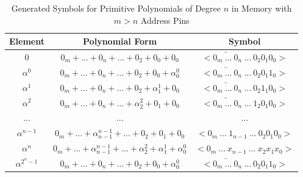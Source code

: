     \begin{table}[h!]
        \def\arraystretch{2.5}
        \caption{Generated Symbols for Primitive Polynomials of Degree $n$ in Memory with $m > n$ Address Pins}
        \centering
        \begin{tabular*}{400pt}{@{\extracolsep{\fill}} ccc}

        \textbf{Element} & \textbf{Polynomial Form} & \textbf{Symbol}
        \\
        \hline $0$ & $0_{m} + \ldots + 0_{n} + \ldots + 0_{2} +
        0_{0} + 0_{0}$ & $< \overleftarrow{0_{m} \ \ldots \
        0_{n}} \ \ldots \ 0_{2} 0_{1} 0_{0} >$ \\


        $\alpha^{0}$ & $0_{m} + \ldots + 0_{n} + \ldots + 0_{2} +
        0_{0} + \alpha^{0}_{0}$ & $< \overleftarrow{0_{m} \ \ldots \
        0_{n}} \ \ldots \ 0_{2} 0_{1} 1_{0} >$ \\

        $\alpha^{1}$ & $0_{m} + \ldots + 0_{n} + \ldots + 0_{2} +
        \alpha^{1}_{1} + 0_{0}$ & $< \overleftarrow{0_{m} \ \ldots \
        0_{n}} \ \ldots \ 0_{2} 1_{1} 0_{0} >$ \\

        $\alpha^{2}$ & $0_{m} + \ldots + 0_{n} + \ldots +
        \alpha^{2}_{2} + 0_{1} + 0_{0}$ & $< \overleftarrow{0_{m} \ \ldots \
        0_{n}} \ \ldots \ 1_{2} 0_{1} 0_{0} >$ \\

        $\ldots$ & $\ldots$ & $\ldots$ \\

        $\alpha^{n-1}$ & $0_{m} + \ldots + \alpha^{n-1}_{n-1} + \ldots
        + 0_{2} + 0_{1} + 0_{0}$ & $< 0_{m} \ \ldots \ 1_{n-1} \ \ldots \
          0_{2} 0_{1} 0_{0} >$ \\

        $\alpha^{n}$ & $0_{m} + \ldots + \alpha^{n-1}_{n-1} + \ldots
        +\alpha^{2}_{2} + \alpha^{1}_{1} + \alpha^{0}_{0}$ & $< 0_{m} \
        \ldots \ x_{n-1} \ \ldots \ x_{2} x_{1} x_{0} >$ \\

        $\alpha^{2^n-1}$ & $0_{m} + \ldots + 0_{n} + \ldots + 0_{2} +
        0_{0} + \alpha^{0}_{0}$ & $< \overleftarrow{0_{m} \ \ldots \
        0_{n}} \ \ldots \ 0_{2} 0_{1} 1_{0} >$ \\

        \end{tabular*}
        \label{table:default_sym}
    \end{table}

    \newpage
